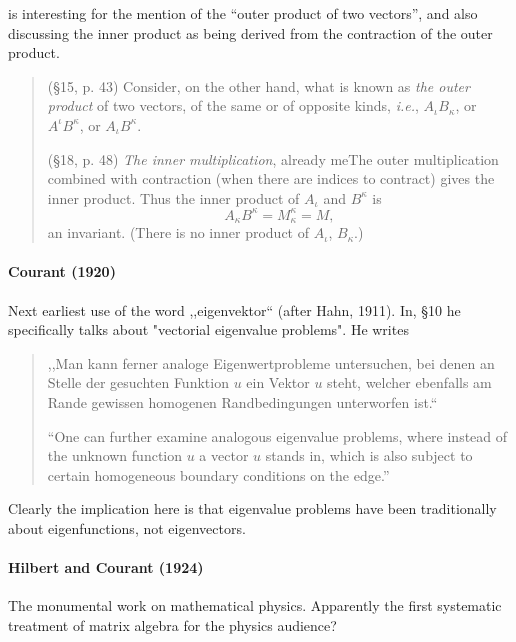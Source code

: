 \cite{Silberstein1922} is interesting for the mention of the ``outer product of two vectors'', and also discussing the inner product as being derived from the contraction of the outer product.
\begin{quote}
(\S 15, p. 43) Consider, on the other hand, what is known as \textit{the outer product} of two vectors, of the same or of opposite kinds, \textit{i.e.}, $A_\iota B_\kappa$, or $A^\iota B^\kappa$, or $A_\iota B^\kappa$.

(\S 18, p. 48) \textit{The inner multiplication}, already meThe outer multiplication combined with contraction (when there are indices to contract) gives the inner product. Thus the inner product of $A_\iota$ and $B^\kappa$ is
\[
A_\kappa B^\kappa = M^\kappa_\kappa = M,
\]
an invariant. (There is no inner product of $A_\iota$, $B_\kappa$.)
\end{quote}



\paragraph{Courant (1920)}

Next earliest use of the word ,,eigenvektor`` (after Hahn, 1911).
In, \S 10 he specifically talks about "vectorial eigenvalue problems". He writes

\begin{quote}
,,Man kann ferner analoge Eigenwertprobleme untersuchen, bei denen an Stelle der gesuchten Funktion $u$ ein Vektor $u$ steht, welcher ebenfalls am Rande gewissen homogenen Randbedingungen unterworfen ist.``

``One can further examine analogous eigenvalue problems, where instead of the unknown function $u$ a vector $u$ stands in, which is also subject to certain homogeneous boundary conditions on the edge.''
\end{quote}

Clearly the implication here is that eigenvalue problems have been traditionally about eigenfunctions, not eigenvectors.



\paragraph{Hilbert and Courant (1924)}

The monumental work on mathematical physics. Apparently the first systematic treatment of matrix algebra for the physics audience?



